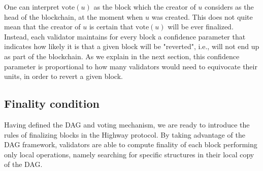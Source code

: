 \documentclass[12pt, fleqn]{article}
\newcommand{\ww}{\mathbb{w}}
\newcommand{\vote}{\mathrm{vote}}
\newcommand{\damian}[1]{\textcolor{orange}{{\bf Damian:} { #1}}}
\DeclareMathOperator*{\argmax}{arg\,max}
\begin{document}
One can interpret $\vote(u)$ as the block which the creator of $u$ considers as the head of the blockchain, at the moment when $u$ was created.
%
This does not quite mean that the creator of $u$ is certain that $\vote(u)$ will be ever finalized.
%
Instead, each validator maintains for every block a confidence parameter that indicates how likely it is that a given block will be "reverted", i.e., will not end up as part of the blockchain.
%
As we explain in the next section, this confidence parameter is proportional to how many validators would need to equivocate their units, in order to revert a given block.






\subsection{Finality condition}\label{sec:finality}

Having defined the DAG and voting mechanism, we are ready to introduce the rules of finalizing blocks in the Highway protocol.
By taking advantage of the DAG framework, validators are able to compute finality of each block performing only local operations, namely searching for specific structures in their local copy of the DAG. 
\end{document}
